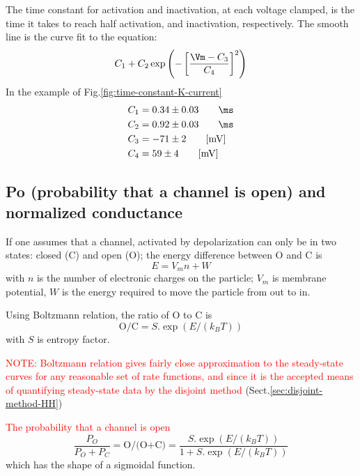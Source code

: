 The time constant for activation and inactivation, at each voltage clamped, is
the time it takes to reach half activation, and inactivation, respectively. The
smooth line is the curve fit to the equation:
\begin{equation}
C_1 + C_2 \exp \left( - \left[\frac{\Vm - C_3}{C_4} \right]^2 \right)
\end{equation}
In the example of Fig.\ref{fig:time-constant-K-current}
\begin{equation}
\begin{split}
C_1 &= 0.34 \pm 0.03 \qquad \ms \\
C_2 &= 0.92 \pm 0.03 \qquad \ms \\
C_3 &= -71 \pm 2 \qquad \text{[mV]} \\
C_4 &= 59 \pm 4  \qquad \text{[mV]}
\end{split}
\end{equation}

\subsection{Po (probability that a channel is open) and normalized conductance}
\label{sec:conductance-normalized}
\label{sec:Boltzmann-equation}

If one assumes that a channel, activated by depolarization can only be in two
states: closed (C) and open (O); the energy difference between O and C is
\begin{equation}
E = V_m n + W
\end{equation}
with $n$ is the number of electronic charges on the particle; $V_m$ is membrane
potential, $W$ is the energy required to move the particle from out to in.

Using Boltzmann relation, the ratio of O to C is
\begin{equation}
\text{O/C} = S. \exp(E/(k_BT))
\end{equation}
with $S$ is entropy factor.

\textcolor{red}{NOTE: Boltzmann relation gives fairly close approximation to the
steady-state curves for any reasonable set of rate functions, and since it is
the accepted means of quantifying steady-state data by the disjoint method}
(Sect.\ref{sec:disjoint-method-HH})


\textcolor{red}{The probability that a channel is open}
\begin{equation}
\frac{P_O}{P_O+ P_C} = \text{O/(O+C)}= \frac{S. \exp(E/(k_BT))}{1+S.
\exp(E/(k_BT))}
\end{equation}
which has the shape of a sigmoidal function.

